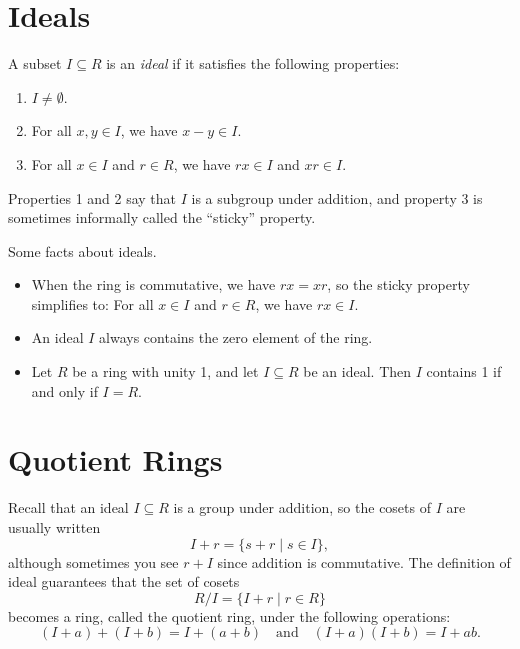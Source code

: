 \section*{Ideals}

\begin{definition}
	A subset $I \subseteq R$ is an \emph{ideal} if it satisfies the following
	properties:
	\begin{enumerate}
		\item $I \neq \emptyset$.
		\item For all $x, y \in I$, we have $x - y \in I$.
		\item For all $x \in I$ and $r \in R$, we have $rx \in I$ and $xr \in I$.
	\end{enumerate}
	Properties 1 and 2 say that $I$ is a subgroup under addition, and property 3
	is sometimes informally called the ``sticky'' property.
\end{definition}

\begin{facts}
	Some facts about ideals.
	\begin{itemize}
		\item When the ring is commutative, we have $rx = xr$, so the sticky
			property simplifies to: For all $x \in I$ and $r \in R$, we have $rx \in
			I$.
		\item An ideal $I$ always contains the zero element of the ring.
		\item Let $R$ be a ring with unity 1, and let $I \subseteq R$ be an ideal.
			Then $I$ contains 1 if and only if $I = R$.
	\end{itemize}
\end{facts}

\section*{Quotient Rings}

\begin{definition}
	Recall that an ideal $I \subseteq R$ is a group under addition, so the
	cosets of $I$ are usually written
	\[
		I + r = \{s + r \mid s \in I\},
	\]
	although sometimes you see $r + I$ since addition is commutative. The
	definition of ideal guarantees that the set of cosets
	\[
		R/I = \{I + r \mid r \in R\}
	\]
	becomes a ring, called the quotient ring, under the following
	operations:
	\[
		(I + a) + (I + b) = I + (a + b) \quad \text{and} \quad (I + a) (I + b) = I +
		ab.
	\]
\end{definition}

